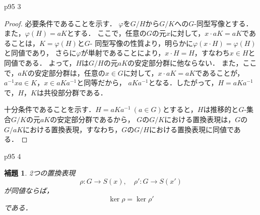 \documentclass[dvipdfmx,uplatex,11pt]{jsarticle}
\theoremstyle{mytheorem}
\newtheorem{lemm}{補題}[section]
\begin{document}
        \newpage 

        p95 3 
        \begin{leftbar}
            \begin{proof}
            必要条件であることを示す．
            $\varphi$を$G /H$から$G / K$への$G$-同型写像とする．また，$\varphi (H)=aK$とする．
            ここで，任意の$G$の元$x$に対して，$x \cdot aK =aK$であることは，$K = \varphi (H)$と$G$- 同型写像の性質より，明らかに$\varphi (x \cdot H)=\varphi (H)$と同値であり，
            さらに$\varphi$が単射であることにより，$x \cdot H = H$，すなわち$x \in H$と同値である．
            よって，$H$は$G /H$の元$aK$の安定部分群に他ならない．
            また，ここで，$aK$の安定部分群は，任意の$x \in G$に対して，$x \cdot aK =aK$であることが，$a^{-1} x a \in K$，$x \in aK a^{-1}$と同等だから，
            $a K a^{-1}$となる．したがって，$H = a K a^{-1}$で，$H$，$K$は共役部分群である．

            十分条件であることを示す．$H = aK a^{-1}~(a \in G)$とすると，$H$は推移的と$G$-集合$G /K$の元$aK$の安定部分群であるから，
            $G$の$G /K$における置換表現は，$G$の$G / aK$における置換表現，すなわち，$G$の$G /H$における置換表現に同値である．
            \end{proof}
        \end{leftbar}

        p95 4 

        \begin{lemm}
            \label{lem:p95.4}
            2つの置換表現
            \[
                \rho \colon G \longrightarrow S(x),\quad \rho ' \colon G \longrightarrow S(x')
            \]
            が同値ならば，
            \[
                \ker \rho = \ker \rho '
            \]
            である．
        \end{lemm}
\end{document}
